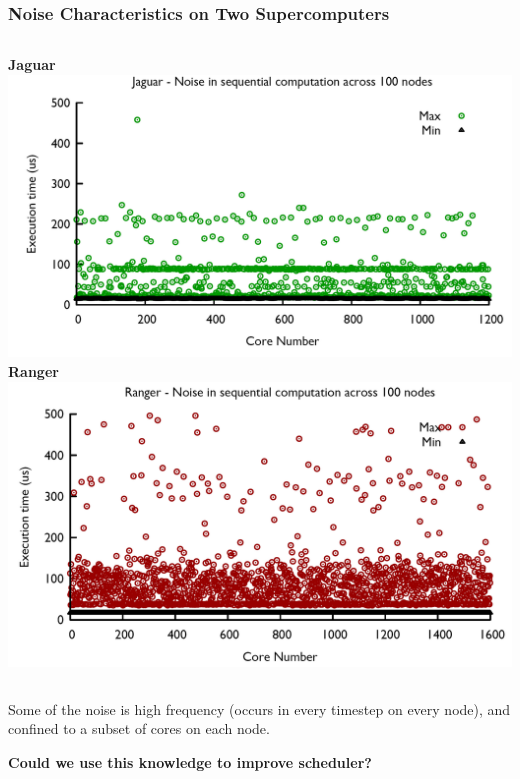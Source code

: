 

\begin{frame}
\frametitle{Noise Characteristics on Two Supercomputers}
\begin{columns}
\centering \textbf{Jaguar} \\
\includegraphics[width=\textwidth]{images/NoiseJaguar} 
\centering \textbf{Ranger} \\
\includegraphics[width=\textwidth]{images/NoiseRanger} 
\end{columns} 

Some of the noise is high frequency (occurs in every timestep on every
node), and confined to a subset of cores on each node. 

\textbf{Could we use this knowledge to improve scheduler? } 
\end{frame} 

